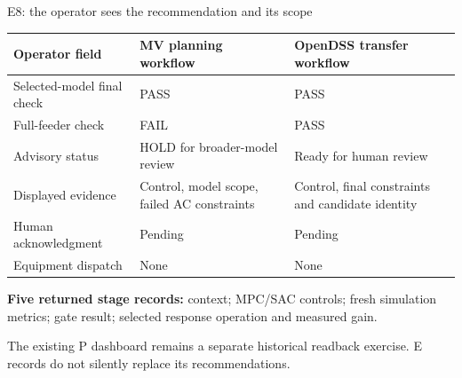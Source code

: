 \begin{frame}[t]{E8: the operator sees the recommendation and its scope}
\deepdive

\fontsize{8.6}{10.2}\selectfont
\begin{tabular}{@{}p{.30\linewidth}p{.30\linewidth}p{.31\linewidth}@{}}
\toprule Operator field & MV planning workflow & OpenDSS transfer workflow \\
\midrule
Selected-model final check & PASS & PASS \\
Full-feeder check & FAIL & PASS \\
Advisory status & HOLD for broader-model review & Ready for human review \\
Displayed evidence & Control, model scope, failed AC constraints & Control, final constraints and candidate identity \\
Human acknowledgment & Pending & Pending \\
Equipment dispatch & None & None \\
\bottomrule\end{tabular}\par\medskip
\textbf{Five returned stage records:} context; MPC/SAC controls; fresh simulation metrics; gate result; selected response operation and measured gain.\par\medskip
The existing P dashboard remains a separate historical readback exercise. E records do not silently replace its recommendations.

\end{frame}
